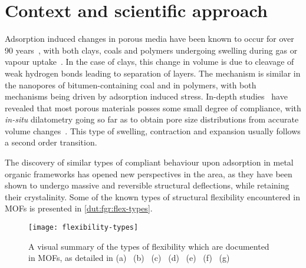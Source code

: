 
\section{Context and scientific approach}

Adsorption induced changes in porous media have been known
to occur for over 90 years~\cite{mcbainNatureInfluenceHumidity1927},
with both clays, coals and polymers undergoing swelling during gas
or vapour uptake~\cite{gorAdsorptioninducedDeformationNanoporous2017}.
In the case of clays, this change in volume is due to cleavage 
of weak hydrogen bonds leading to separation of layers. The 
mechanism is similar in the nanopores of bitumen-containing coal
and in polymers, with both mechanisms being driven by adsorption
induced stress. In-depth studies~\cite{beringAlterationZeoliteGranule1977} 
have revealed that most porous materials posses some small
degree of compliance, with \textit{in-situ }dilatometry going so far as to 
obtain pore size distributions from accurate volume
changes~\cite{reichenauerExtractingPoreSize2001}. This type of
swelling, contraction and expansion usually follows a second order
transition.

The discovery of similar types of compliant behaviour upon 
adsorption in metal organic frameworks has opened new perspectives 
in the area, as they have been shown to undergo massive and 
reversible structural deflections, while retaining their crystalinity.
Some of the known types of structural flexibility encountered in MOFs
is presented in \autoref{dut:fgr:flex-types}. 


\begin{figure}[htb]
    \centering
    
    \texttt{[image: flexibility-types]}%
    \caption{A visual summary of the types of flexibility
    which are documented in MOFs, as detailed in 
    (a)~\citet{liHydrogenBondregulatedMicroporous2001}
    (b)~\citet{kitauraPorousCoordinationPolymerCrystals2003}
    (c)~\citet{kitauraPillaredLayerCoordinationPolymer2002}
    (d)~\citet{kepertVersatileFamilyInterconvertible2000,%
    kitauraPorousCoordinationPolymerCrystals2003}
    (e)~\citet{nelsonSupercriticalProcessingRoute2009}
    (f)~\citet{fairen-jimenezOpeningGateFramework2011}
    (g)~\citet{bourrellyDifferentAdsorptionBehaviors2005, %
    serreExplanationVeryLarge2007}}%
    \label{dut:fgr:flex-types}
    
\end{figure}

